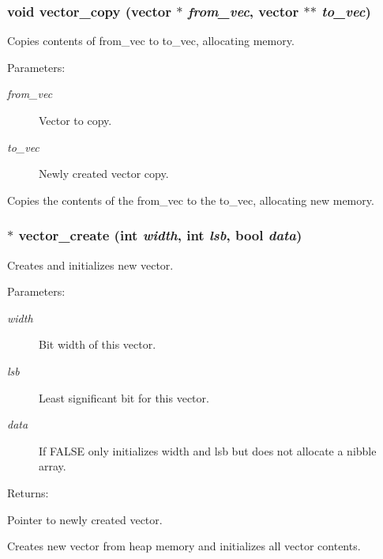 \subsubsection{\setlength{\rightskip}{0pt plus 5cm}void vector\_\-copy ({\bf vector} $\ast$ {\em from\_\-vec}, {\bf vector} $\ast$$\ast$ {\em to\_\-vec})}\label{vector_8h_a2}


Copies contents of from\_\-vec to to\_\-vec, allocating memory.

\begin{Desc}
\item[Parameters: ]\par
\begin{description}
\item[{\em 
from\_\-vec}]Vector to copy. \item[{\em 
to\_\-vec}]Newly created vector copy.\end{description}
\end{Desc}
Copies the contents of the from\_\-vec to the to\_\-vec, allocating new memory. 
\subsubsection{$\ast$ vector\_\-create (int {\em width}, int {\em lsb}, {\bf bool} {\em data})}\label{vector_8h_a1}


Creates and initializes new vector.

\begin{Desc}
\item[Parameters: ]\par
\begin{description}
\item[{\em 
width}]Bit width of this vector. \item[{\em 
lsb}]Least significant bit for this vector. \item[{\em 
data}]If FALSE only initializes width and lsb but does not allocate a nibble array.\end{description}
\end{Desc}
\begin{Desc}
\item[Returns: ]\par
Pointer to newly created vector.\end{Desc}
Creates new vector from heap memory and initializes all vector contents. 
